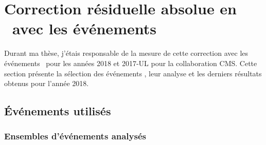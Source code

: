 \section{Correction résiduelle absolue en \pT\ avec les événements \Gjets}\label{chapter-JERC-section-JES}
Durant ma thèse, j'étais responsable de la mesure de cette correction avec les événements \Gjets\ pour les années 2018 et 2017-UL pour la collaboration CMS.
Cette section présente la sélection des événements \Gjets, leur analyse et les derniers résultats obtenus pour l'année 2018.
\subsection{Événements utilisés}\label{chapter-JERC-section-JES-subsec-evt_select}
\subsubsection{Ensembles d'événements analysés}
%     
%     
%     
%
%
%     
%     
%     
%     
%
%
%     
